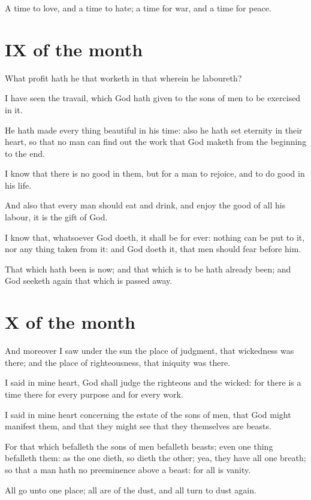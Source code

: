 \documentclass[0main.tex]{subfiles}
\begin{document}
A time to love, and a time to hate; a time for war, and a time for peace.

\section*{IX of the month}

What profit hath he that worketh in that wherein he laboureth?

I have seen the travail, which God hath given to the sons of men to be exercised in it.

He hath made every thing beautiful in his time: also he hath set eternity in their heart, so that no man can find out the work that God maketh from the beginning to the end.

I know that there is no good in them, but for a man to rejoice, and to do good in his life.

And also that every man should eat and drink, and enjoy the good of all his labour, it is the gift of God.

I know that, whatsoever God doeth, it shall be for ever: nothing can be put to it, nor any thing taken from it: and God doeth it, that men should fear before him.

That which hath been is now; and that which is to be hath already been; and God seeketh again that which is passed away.

\section*{X of the month}

And moreover I saw under the sun the place of judgment, that wickedness was there; and the place of righteousness, that iniquity was there.

I said in mine heart, God shall judge the righteous and the wicked: for there is a time there for every purpose and for every work.

I said in mine heart concerning the estate of the sons of men, that God might manifest them, and that they might see that they themselves are beasts.

For that which befalleth the sons of men befalleth beasts; even one thing befalleth them: as the one dieth, so dieth the other; yea, they have all one breath; so that a man hath no preeminence above a beast: for all is vanity.

All go unto one place; all are of the dust, and all turn to dust again.
\end{document}
